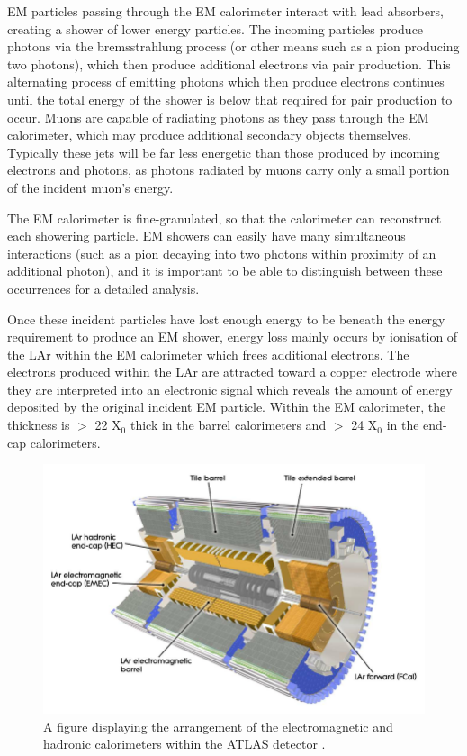 \documentclass[12pt,a4paper,epsf,portrait,times,epsfig]{article}
\begin{document}
		EM particles passing through the EM calorimeter interact with lead absorbers, creating a shower of lower energy particles. The incoming particles produce photons via the bremsstrahlung process (or other means such as a pion producing two photons), which then produce additional electrons via pair production. This alternating process of emitting
		photons which then produce electrons continues until the total energy of the shower is below that required for pair production to occur. Muons are capable of radiating photons as they pass through the EM calorimeter, which may produce additional secondary objects themselves. Typically these jets will be far less energetic than those produced by incoming electrons and photons,
		as photons radiated by muons carry only a small portion of the incident muon’s energy. \par
		
		The EM calorimeter is fine-granulated, so that the calorimeter can reconstruct each showering particle. EM showers can easily have many simultaneous interactions (such as a pion decaying into two photons within proximity of an additional photon), and it is important
		to be able to distinguish between these occurrences for a detailed analysis. \par
		
		Once these incident particles have lost enough energy to be beneath the energy requirement to produce an EM shower, energy loss mainly occurs by ionisation of the LAr within the EM calorimeter which frees additional electrons. The electrons produced within the LAr are attracted toward a copper electrode where they are interpreted into an electronic signal which reveals the amount of energy
		deposited by the original incident EM particle. Within the EM calorimeter, the thickness	is $>$ 22 X$_{0}$ thick in the barrel calorimeters and $>$ 24 X$_{0}$ in the end-cap calorimeters. \par
		
		\begin{figure}
			\centering
			\includegraphics[scale=0.4]{ATLAS_Calorimeters}
			\caption{A figure displaying the arrangement of the electromagnetic and hadronic calorimeters within the ATLAS detector \cite{Article:ATLASDesignPaper}.}
			\label{Fig:ATLASCalorimeters} 
		\end{figure} 
		
\end{document}
